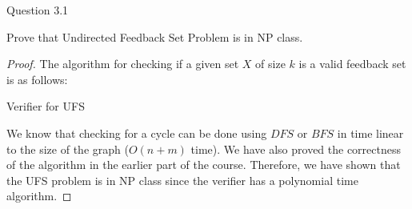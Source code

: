 \begin{solution}{Question 3.1}\label{ques:31}
    \begin{question}
      Prove that Undirected Feedback Set Problem is in NP class.
    \end{question}
    \tcblower{}
    \begin{proof}
      The algorithm for checking if a given set $X$ of size $k$ is a valid feedback set is as follows:
      \begin{algorithm}[H]
        \caption{Verifier for UFS}
        \begin{algorithmic}
          \EndProcedure{}
        \end{algorithmic}
      \end{algorithm}
      We know that checking for a cycle can be done using $DFS$ or $BFS$ in time linear to the size of the graph ($O(n + m)$ time). We have also proved the correctness of the algorithm in the earlier part of the course. Therefore, we have shown that the UFS problem is in NP class since the verifier has a polynomial time algorithm.
    \end{proof}
\end{solution}
